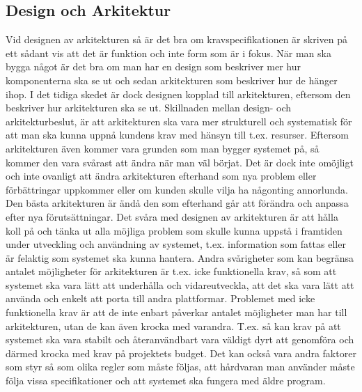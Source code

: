 \subsection{Design och Arkitektur}
Vid designen av arkitekturen så är det bra om kravspecifikationen är skriven på ett sådant vis att det är funktion och inte form som är i fokus. När man ska bygga något är det bra om man har en design som beskriver mer hur komponenterna ska se ut och sedan arkitekturen som beskriver hur de hänger ihop. I det tidiga skedet är dock designen kopplad till arkitekturen, eftersom den beskriver hur arkitekturen ska se ut.
\newline
\newline
Skillnaden mellan design- och arkitekturbeslut, är att arkitekturen ska vara mer strukturell och systematisk för att man ska kunna uppnå kundens krav med hänsyn till t.ex. resurser. Eftersom arkitekturen även kommer vara grunden som man bygger systemet på, så kommer den vara svårast att ändra när man väl börjat. Det är dock inte omöjligt och inte ovanligt att ändra arkitekturen efterhand som nya problem eller förbättringar uppkommer eller om kunden skulle vilja ha någonting annorlunda. Den bästa arkitekturen är ändå den som efterhand går att förändra och anpassa efter nya förutsättningar.
\newline
\newline
Det svåra med designen av arkitekturen är att hålla koll på och tänka ut alla möjliga problem som skulle kunna uppstå i framtiden under utveckling och användning av systemet, t.ex. information som fattas eller är felaktig som systemet ska kunna hantera. Andra svårigheter som kan begränsa antalet möjligheter för arkitekturen är t.ex. icke funktionella krav, så som att systemet ska vara lätt att underhålla och vidareutveckla, att det ska vara lätt att använda och enkelt att porta till andra plattformar. Problemet med icke funktionella krav är att de inte enbart påverkar antalet möjligheter man har till arkitekturen, utan de kan även krocka med varandra. T.ex. så kan krav på att systemet ska vara stabilt och återanvändbart vara väldigt dyrt att genomföra och därmed krocka med krav på projektets budget. Det kan också vara andra faktorer som styr så som olika regler som måste följas, att hårdvaran man använder måste följa vissa specifikationer och att systemet ska fungera med äldre program.
\newline
\newline
